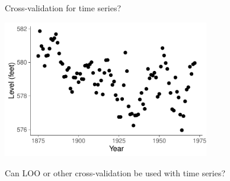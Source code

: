 \documentclass[english,t]{beamer}
\begin{document}
\begin{frame}{Cross-validation for time series?}

  \includegraphics[width=9cm]{lake2data.pdf}

  
  {Can LOO or other cross-validation be used with time series?}
  
\end{frame}
\end{document}
